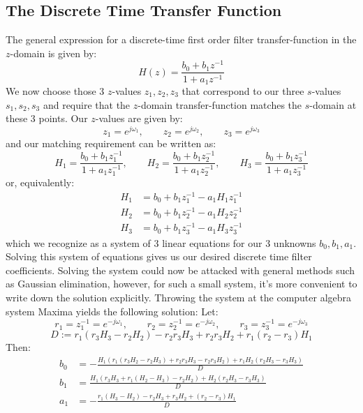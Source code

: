 \subsection{The Discrete Time Transfer Function}
The general expression for a discrete-time first order filter transfer-function in the $z$-domain is given by:
\begin{equation}
 H(z) = \frac{b_0 + b_1 z^{-1}}{1 + a_1 z^{-1}}
\end{equation}
We now choose those 3 $z$-values $z_1, z_2, z_3$ that correspond to our three $s$-values $s_1, s_2, s_3$ and require that the $z$-domain transfer-function matches the $s$-domain at these 3 points. Our $z$-values are given by:
\begin{equation}
 z_1 = e^{j \omega_1}, \qquad z_2 = e^{j \omega_2}, \qquad z_3 = e^{j \omega_3}
\end{equation}
and our matching requirement can be written as:
\begin{equation}
 H_1 =  \frac{b_0 + b_1 z_1^{-1}}{1 + a_1 z_1^{-1}}, \qquad
 H_2 =  \frac{b_0 + b_1 z_2^{-1}}{1 + a_1 z_2^{-1}}, \qquad
 H_3 =  \frac{b_0 + b_1 z_3^{-1}}{1 + a_1 z_3^{-1}}
\end{equation}
or, equivalently:
\begin{equation}
 \begin{aligned}
  H_1 &= b_0 + b_1 z_1^{-1} - a_1 H_1 z_1^{-1}  \\
  H_2 &= b_0 + b_1 z_2^{-1} - a_1 H_2 z_2^{-1}  \\
  H_3 &= b_0 + b_1 z_3^{-1} - a_1 H_3 z_3^{-1}
 \end{aligned}
\end{equation}
which we recognize as a system of 3 linear equations for our 3 unknowns $b_0, b_1, a_1$. Solving this system of equations gives us our desired discrete time filter coefficients. Solving the system could now be attacked with general methods such as Gaussian elimination, however, for such a small system, it's more convenient to write down the solution explicitly. Throwing the system at the computer algebra system Maxima yields the following solution:
Let:
\begin{equation}
 r_1 = z_1^{-1} = e^{-j \omega_1}, \qquad r_2 = z_2^{-1} = e^{-j \omega_2}, \qquad r_3 = z_3^{-1} = e^{-j \omega_3}
\end{equation}
\begin{equation}
 D := r_1(r_3 H_3-r_2 H_2)-r_2 r_3 H_3+r_2 r_3 H_2+r_1 (r_2-r_3) H_1
\end{equation}
Then:
\begin{equation}
 \begin{aligned}
  b_0 &= -\frac{H_1 (r_1 (r_3 H_2-r_2 H_3)+r_2 r_3 H_3-r_2 r_3 H_2)+r_1 H_2 (r_2 H_3-r_3 H_3)}{D}  \\
  b_1 &=  \frac{H_1 (r_3 H_3+r_1 (H_2-H_3)-r_2 H_2)+H_2 (r_2 H_3-r_3 H_3)}{D}  \\
  a_1 &= -\frac{r_1 (H_3-H_2)-r_2 H_3+r_3 H_2+(r_2-r_3) H_1}{D}
 \end{aligned}
\end{equation}

